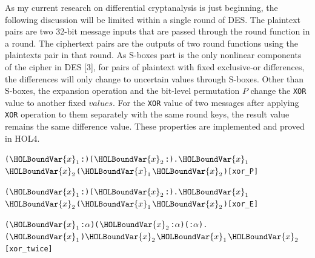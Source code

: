 \documentclass{article}
\begin{document}
As my current research on differential cryptanalysis is just beginning, the following discussion will be limited within
a single round of DES. The plaintext pairs are two 32-bit message inputs that are passed through the round function
in a round. The ciphertext pairs are the outputs of two round functions using the plaintexts pair in that round.
As S-boxes part is the only nonlinear components of the cipher in DES [3], for pairs of plaintext with fixed
exclusive-or differences, the differences will only change to uncertain values through S-boxes. Other than S-boxes,
the expansion operation and the bit-level permutation $P$ change the \verb|XOR| value to another fixed $values$. For the \verb|XOR| value
of two messages after applying \verb|XOR| operation to them separately with the same round keys, the result value remains the same
difference value. These properties are implemented and proved in HOL4.

\begin{alltt}
  \HOLTokenTurnstile{} \HOLSymConst{\HOLTokenForall{}}(\ensuremath{\HOLBoundVar{x}\sb{\mathrm{1}}} :) (\ensuremath{\HOLBoundVar{x}\sb{\mathrm{2}}} :).  \ensuremath{\HOLBoundVar{x}\sb{\mathrm{1}}} \HOLSymConst{\HOLTokenEor{}}  \ensuremath{\HOLBoundVar{x}\sb{\mathrm{2}}} \HOLSymConst{=}  (\ensuremath{\HOLBoundVar{x}\sb{\mathrm{1}}} \HOLSymConst{\HOLTokenEor{}} \ensuremath{\HOLBoundVar{x}\sb{\mathrm{2}}})\hfill{[xor_P]}
\end{alltt}

\begin{alltt}
  \HOLTokenTurnstile{} \HOLSymConst{\HOLTokenForall{}}(\ensuremath{\HOLBoundVar{x}\sb{\mathrm{1}}} :) (\ensuremath{\HOLBoundVar{x}\sb{\mathrm{2}}} :).  \ensuremath{\HOLBoundVar{x}\sb{\mathrm{1}}} \HOLSymConst{\HOLTokenEor{}}  \ensuremath{\HOLBoundVar{x}\sb{\mathrm{2}}} \HOLSymConst{=}  (\ensuremath{\HOLBoundVar{x}\sb{\mathrm{1}}} \HOLSymConst{\HOLTokenEor{}} \ensuremath{\HOLBoundVar{x}\sb{\mathrm{2}}})\hfill{[xor_E]}
\end{alltt}

\begin{alltt}
  \HOLTokenTurnstile{} \HOLSymConst{\HOLTokenForall{}}(\ensuremath{\HOLBoundVar{x}\sb{\mathrm{1}}} :\ensuremath{\alpha} ) (\ensuremath{\HOLBoundVar{x}\sb{\mathrm{2}}} :\ensuremath{\alpha} ) ( :\ensuremath{\alpha} ).
     (\ensuremath{\HOLBoundVar{x}\sb{\mathrm{1}}} \HOLSymConst{\HOLTokenEor{}} ) \HOLSymConst{\HOLTokenEor{}} \ensuremath{\HOLBoundVar{x}\sb{\mathrm{2}}} \HOLSymConst{\HOLTokenEor{}}  \HOLSymConst{=} \ensuremath{\HOLBoundVar{x}\sb{\mathrm{1}}} \HOLSymConst{\HOLTokenEor{}} \ensuremath{\HOLBoundVar{x}\sb{\mathrm{2}}}\hfill{[xor_twice]}
\end{alltt}
\end{document}
